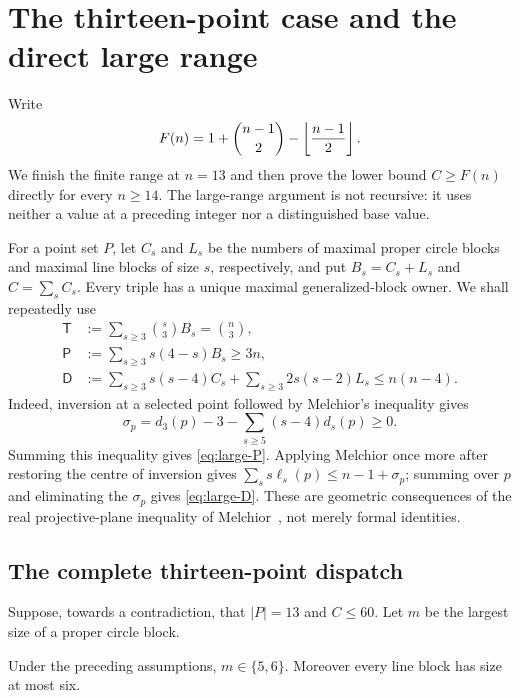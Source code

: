 \section{The thirteen-point case and the direct large range}
\label{sec:n13-infinity}

Write
\[
  F(n)=1+\binom{n-1}{2}-\left\lfloor \frac{n-1}{2}\right\rfloor.
\]
We finish the finite range at $n=13$ and then prove the lower bound
$C\geq F(n)$ directly for every $n\geq14$.  The large-range argument is
not recursive: it uses neither a value at a preceding integer nor a
distinguished base value.

For a point set $P$, let $C_s$ and $L_s$ be the numbers of maximal proper
circle blocks and maximal line blocks of size $s$, respectively, and put
$B_s=C_s+L_s$ and $C=\sum_s C_s$.  Every triple has a unique maximal
generalized-block owner.  We shall repeatedly use
\begin{align}
 \mathsf T&:=\sum_{s\geq3}\binom{s}{3}B_s=\binom n3,
                                                        \label{eq:large-T}\\
 \mathsf P&:=\sum_{s\geq3}s(4-s)B_s\geq3n,             \label{eq:large-P}\\
 \mathsf D&:=\sum_{s\geq3}s(s-4)C_s
       +\sum_{s\geq3}2s(s-2)L_s\leq n(n-4).           \label{eq:large-D}
\end{align}
Indeed, inversion at a selected point followed by Melchior's inequality
gives
\[
 \sigma_p=d_3(p)-3-\sum_{s\geq5}(s-4)d_s(p)\geq0.
\]
Summing this inequality gives \eqref{eq:large-P}.  Applying Melchior once
more after restoring the centre of inversion gives
\(\sum_s s\ell_s(p)\leq n-1+\sigma_p\); summing over $p$ and eliminating
the $\sigma_p$ gives \eqref{eq:large-D}.  These are geometric consequences
of the real projective-plane inequality of Melchior~\cite{Melchior1940},
not merely formal identities.

\subsection{The complete thirteen-point dispatch}

Suppose, towards a contradiction, that $|P|=13$ and $C\leq60$.  Let $m$
be the largest size of a proper circle block.

\begin{lemma}
\label{lem:n13-outer}
Under the preceding assumptions, $m\in\{5,6\}$.  Moreover every line block
has size at most six.
\end{lemma}

